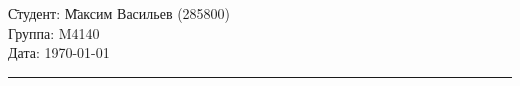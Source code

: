 \begin{tabbing}
\hspace{11cm} \= Студент: \= Максим Васильев (285800)\\
  \> Группа: \>  M4140 \\
  \> Дата: \> \today
\end{tabbing}
\hrule
\vspace{1cm}

